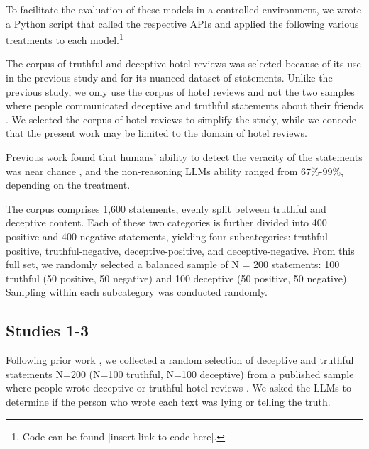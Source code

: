 \documentclass{article}
\begin{document}
To facilitate the evaluation of these models in a controlled environment, we wrote a Python script that called the respective APIs and applied the following various treatments to each model.\footnote{Code can be found [insert link to code here].} %

The corpus of truthful and deceptive hotel reviews \citep{ott_finding_2011} was selected because of its use in the previous study \citep{markowitz_generative_2024} and for its nuanced dataset of statements. Unlike the previous study, we only use the corpus of hotel reviews \citep{ott_finding_2011} and not the two samples where people communicated deceptive and truthful statements about their friends \citep{markowitz_when_2020, lloyd_miami_2019}. We selected the corpus of hotel reviews to simplify the study, while we concede that the present work may be limited to the domain of hotel reviews.

Previous work \citep{markowitz_generative_2024} found that humans' ability to detect the veracity of the statements was near chance \citep{markowitz_generative_2024}, and the non-reasoning LLMs ability ranged from 67\%-99\%, depending on the treatment.

The corpus comprises 1,600 statements, evenly split between truthful and deceptive content. Each of these two categories is further divided into 400 positive and 400 negative statements, yielding four subcategories: truthful-positive, truthful-negative, deceptive-positive, and deceptive-negative. From this full set, we randomly selected a balanced sample of N = 200 statements: 100 truthful (50 positive, 50 negative) and 100 deceptive (50 positive, 50 negative). Sampling within each subcategory was conducted randomly.


\subsection{Studies 1-3}

Following prior work \citep{markowitz_generative_2024}, we collected a random selection of deceptive and truthful statements N=200 (N=100 truthful, N=100 deceptive) from a published sample where people wrote deceptive or truthful hotel reviews \citep{ott_finding_2011}. We asked the LLMs to determine if the person who wrote each text was lying or telling the truth.
\end{document}
